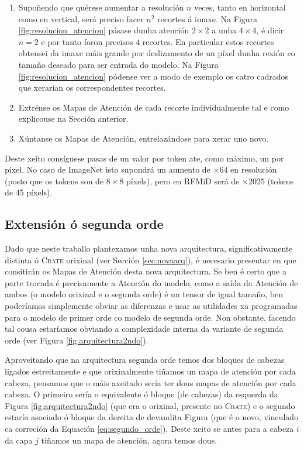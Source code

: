 \begin{enumerate}[label=(\alph*)]
				\item Supoñendo que quérese aumentar a resolución $n$ veces, tanto en horizontal como en vertical, será preciso facer $n^2$ recortes á imaxe. Na Figura \ref{fig:resolucion_atencion} pásase dunha atención $2\times 2$ a unha $4 \times 4$, é dicir $n=2$ e por tanto foron precisos $4$ recortes. En particular estos recortes obtensei da imaxe máis grande por deslizamento de un \gls{píxel} dunha rexión co tamaño deseado para ser entrada do modelo. Na Figura \ref{fig:resolucion_atencion} pódense ver a modo de exemplo os catro cadrados que xerarían os correspondentes recortes.
    \item Extrénse os Mapas de Atención de cada recorte individualmente tal e como explicouse na Sección anterior.
    \item Xúntanse os Mapas de Atención, entrelazándose para xerar uno novo.
\end{enumerate}

Deste xeito consíguese pasas de un valor por \gls{token} ate, como máximo, un por \gls{píxel}. No caso de ImageNet isto supondrá un aumento de $\times 64$ en resolución (posto que os \glspl{token} son de $8\times 8$ \glspl{píxel}), pero en RFMiD será de $\times 2025$ (\glspl{token} de 45 \glspl{píxel}).

\subsection{Extensión ó segunda orde}
\label{sec:extension-2ndoorde}

Dado que neste traballo plantexamos unha nova arquitectura, significativamente distinta ó \textsc{Crate} orixinal (ver Sección \ref{sec:novaarq}), é necesario presentar en que consitirán os Mapas de Atención desta nova arquitectura. Se ben é certo que a parte trocada é precisamente a Atención do modelo, como a saída da Atención de ambos (o modelo orixinal e o segunda orde) é un tensor de igual tamaño, ben poderíamos simplemente obviar as diferenzas e usar as utilidades xa programadas para o modelo de  primer orde co modelo de segunda orde. Non obstante, facendo tal cousa estaríamos obviando a complexidade interna da variante de segunda orde (ver Figura \ref{fig:arquitectura2ndo}).

Aproveitando que na arquitectura segunda orde temos dos bloques de cabezas ligados estreitamente e que orixinalmente tiñamos un mapa de atención por cada cabeza, pensamos que o máis axeitado sería ter dous mapas de atención por cada cabeza. O primeiro sería o equivalente ó bloque (de cabezas) da esquerda da Figura \ref{fig:arquitectura2ndo} (que era o orixinal, presente no \textsc{Crate}) e o segundo estaría asociado ó bloque da dereita de devandita Figura (que é o novo, vinculado ca correción da Equación \ref{eq:segundo_orde}). Deste xeito se antes para a cabeza $i$ da capa $j$ tiñamos un mapa de atención, agora temos dous.


